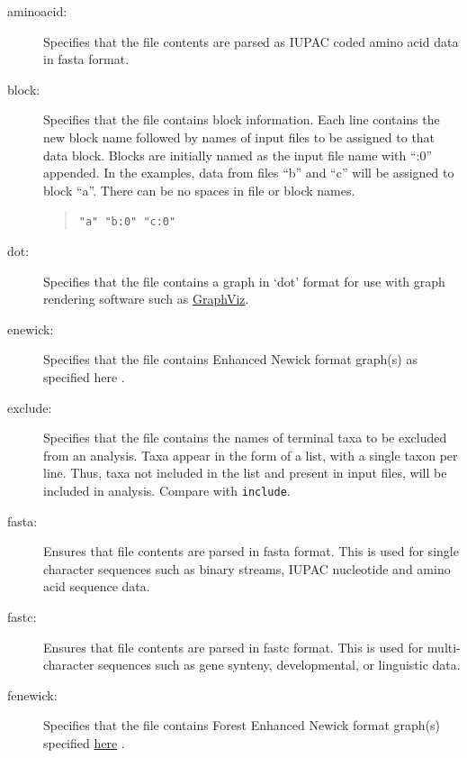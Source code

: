 	\begin{description}
		\item [aminoacid:] Specifies that the file contents are parsed as IUPAC coded amino 
		acid data in fasta \citep{PearsonandLipman1988} format.

		\item [block:] Specifies that the file contains block %
		information. Each line contains 
		the new block name followed by names of input files to be assigned to that data block. 
		Blocks are initially named as the input file name with ``:0'' appended. In the examples, 
		data from files ``b'' and ``c'' will be assigned to block ``a''. There can be no spaces in 
		file or block names.
			
			\begin{quote}
			\texttt{"a" "b:0" "c:0"}
			\end{quote}
	
		\item [dot:] Specifies that the file contains a graph in `dot' format for use with graph 
		rendering software such as \href{https://en.wikipedia.org/wiki/Graphviz}{GraphViz}.
			
		\item [enewick:] Specifies that the file contains Enhanced Newick format graph(s) as
		specified here \citep{Cardonaetal2008}. 
			
		\item [exclude:] Specifies that the file contains the names of terminal taxa to be 
		excluded from an analysis. Taxa appear in the form of a list, with a single taxon per 
		line. Thus, taxa not included in the list and present in input files, will be included in 
		analysis. Compare with \texttt{include}.
			
		\item [fasta:] Ensures that file contents are parsed in fasta \citep{PearsonandLipman1988}
		format. This is used for single character sequences such as binary streams, IUPAC 
		nucleotide and amino acid sequence data.
			
		\item [fastc:] Ensures that file contents are parsed in fastc \citep{WheelerandWashburn2019}
		format. This is used for multi-character sequences such as gene synteny, developmental, 
		or linguistic data.
			
		\item [fenewick:] Specifies that the file contains Forest Enhanced Newick format graph(s)  
		specified \href{https://www.github.com/wardwheeler/euncon}{here} \citep{Wheeler2022}.
			

\end{description}
